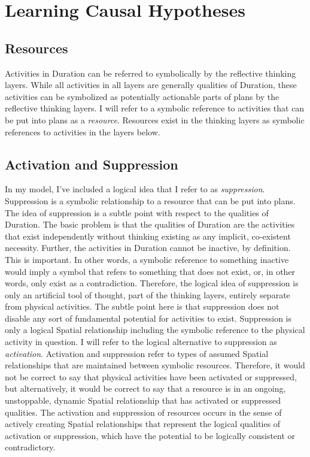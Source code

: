 \chapter{Learning Causal Hypotheses}
\label{chapter:learning_causal_hypotheses}

\section{Resources}

Activities in Duration can be referred to symbolically by the
reflective thinking layers.  While all activities in all layers are
generally qualities of Duration, these activities can be symbolized as
potentially actionable parts of plans by the reflective thinking
layers.  I will refer to a symbolic reference to activities that can
be put into plans as a \emph{resource}.  Resources exist in the
thinking layers as symbolic references to activities in the layers
below.

\section{Activation and Suppression}

In my model, I've included a logical idea that I refer to as
\emph{suppression}.  Suppression is a symbolic relationship to a
resource that can be put into plans.  The idea of suppression is a
subtle point with respect to the qualities of Duration.  The basic
problem is that the qualities of Duration are the activities that
exist independently without thinking existing as any implicit,
co-existent necessity.  Further, the activities in Duration cannot be
inactive, by definition.  This is important.  In other words, a
symbolic reference to something inactive would imply a symbol that
refers to something that does not exist, or, in other words, only
exist as a contradiction.  Therefore, the logical idea of suppression
is only an artificial tool of thought, part of the thinking layers,
entirely separate from physical activities.  The subtle point here is
that suppression does not disable any sort of fundamental potential
for activities to exist.  Suppression is only a logical Spatial
relationship including the symbolic reference to the physical activity
in question.  I will refer to the logical alternative to suppression
as \emph{activation}.  Activation and suppression refer to types of
assumed Spatial relationships that are maintained between symbolic
resources.  Therefore, it would not be correct to say that physical
activities have been activated or suppressed, but alternatively, it
would be correct to say that a resource is in an ongoing, unstoppable,
dynamic Spatial relationship that has activated or suppressed
qualities.  The activation and suppression of resources occurs in the
sense of actively creating Spatial relationships that represent the
logical qualities of activation or suppression, which have the
potential to be logically consistent or contradictory.

